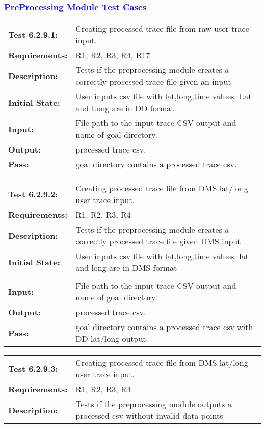 \documentclass[12pt, titlepage]{article}
\begin{document}
\textcolor{blue}{
\subsubsection{PreProcessing Module Test Cases}
\begin{tabular}{|l|p{10cm}|}
    \hline
    \bf{Test} 6.2.9.1: & Creating processed trace file from raw user trace input. \\
    \bf{Requirements}: & R1, R2, R3, R4, R17 \\
    \bf{Description}: & Tests if the preprocessing module creates a correctly processed trace file given an input \\
    \bf{Initial State}: &  User inputs csv file with lat,long,time values. Lat and Long are in DD format. \\
    \bf{Input}: & File path to the input trace CSV output and name of goal directory. \\
    \bf{Output}: & processed trace csv. \\
    \bf{Pass}: & goal directory contains a processed trace csv. \\
    \hline
\end{tabular}
\begin{tabular}{|l|p{10cm}|}
    \hline
    \bf{Test} 6.2.9.2: & Creating processed trace file from DMS lat/long user trace input. \\
    \bf{Requirements}: &  R1, R2, R3, R4 \\
    \bf{Description}: & Tests if the preprocessing module creates a correctly processed trace file given DMS input \\
    \bf{Initial State}: &  User inputs csv file with lat,long,time values. lat and long are in DMS format\\\\
    \bf{Input}: & File path to the input trace CSV output and name of goal directory. \\
    \bf{Output}: & processed trace csv. \\
    \bf{Pass}: & goal directory contains a processed trace csv with DD lat/long output. \\
    \hline
\end{tabular}
\begin{tabular}{|l|p{10cm}|}
    \hline
    \bf{Test} 6.2.9.3: & Creating processed trace file from DMS lat/long user trace input. \\
    \bf{Requirements}: & R1, R2, R3, R4\\
    \bf{Description}: & Tests if the preprocessing module outputs a processed csv without invalid data points \\

\end{tabular}}
\end{document}
